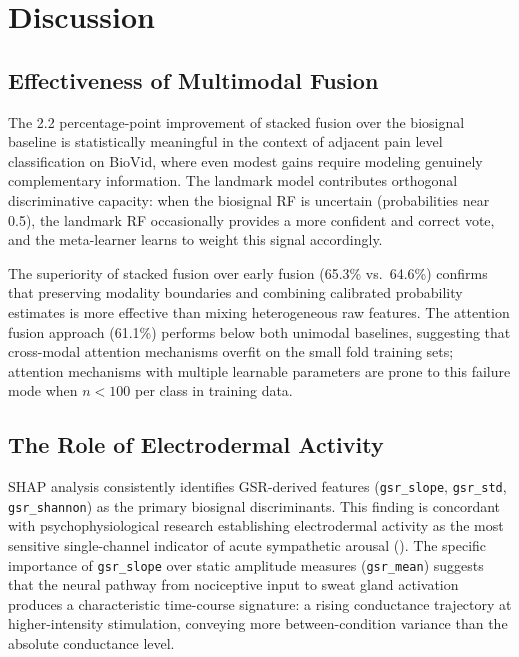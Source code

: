 \documentclass[10pt, twocolumn]{article}
\begin{document}
\FloatBarrier
\section{Discussion}
\label{sec:discussion}

\subsection{Effectiveness of Multimodal Fusion}

The 2.2 percentage-point improvement of stacked fusion over the biosignal baseline is
statistically meaningful in the context of adjacent pain level classification on BioVid,
where even modest gains require modeling genuinely complementary information. The landmark
model contributes orthogonal discriminative capacity: when the biosignal RF is uncertain
(probabilities near 0.5), the landmark RF occasionally provides a more confident and
correct vote, and the meta-learner learns to weight this signal accordingly.

The superiority of stacked fusion over early fusion (65.3\% vs.\ 64.6\%) confirms that
preserving modality boundaries and combining calibrated probability estimates is more
effective than mixing heterogeneous raw features. The attention fusion approach (61.1\%)
performs below both unimodal baselines, suggesting that cross-modal attention mechanisms
overfit on the small fold training sets; attention mechanisms with multiple learnable
parameters are prone to this failure mode when $n < 100$ per class in training data.

\subsection{The Role of Electrodermal Activity}

SHAP analysis consistently identifies GSR-derived features (\texttt{gsr\_slope},
\texttt{gsr\_std}, \texttt{gsr\_shannon}) as the primary biosignal discriminants. This
finding is concordant with psychophysiological research establishing electrodermal activity
as the most sensitive single-channel indicator of acute sympathetic arousal
(\cite{Fowles1986}). The specific importance of \texttt{gsr\_slope} over static amplitude
measures (\texttt{gsr\_mean}) suggests that the neural pathway from nociceptive input to
sweat gland activation produces a characteristic time-course signature: a rising
conductance trajectory at higher-intensity stimulation, conveying more between-condition
variance than the absolute conductance level.
\end{document}
